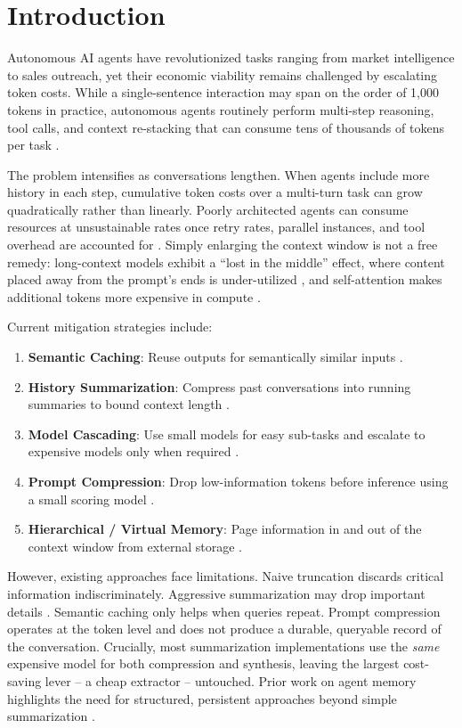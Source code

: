 \documentclass[conference]{IEEEtran}
\begin{document}
\section{Introduction}

Autonomous AI agents have revolutionized tasks ranging from market intelligence to sales outreach, yet their economic viability remains challenged by escalating token costs. While a single-sentence interaction may span on the order of 1,000 tokens in practice, autonomous agents routinely perform multi-step reasoning, tool calls, and context re-stacking that can consume tens of thousands of tokens per task \cite{zhou2024agents, shinn2023reflexion, park2023generative}.

The problem intensifies as conversations lengthen. When agents include more history in each step, cumulative token costs over a multi-turn task can grow quadratically rather than linearly. Poorly architected agents can consume resources at unsustainable rates once retry rates, parallel instances, and tool overhead are accounted for \cite{shinn2023reflexion}. Simply enlarging the context window is not a free remedy: long-context models exhibit a ``lost in the middle'' effect, where content placed away from the prompt's ends is under-utilized \cite{nfliu2023lost}, and self-attention makes additional tokens more expensive in compute \cite{packer2023memgpt}.

Current mitigation strategies include:
\begin{enumerate}
    \item \textbf{Semantic Caching}: Reuse outputs for semantically similar inputs \cite{bang2023gptcache}.
    \item \textbf{History Summarization}: Compress past conversations into running summaries to bound context length \cite{sung2024wmt}.
    \item \textbf{Model Cascading}: Use small models for easy sub-tasks and escalate to expensive models only when required \cite{chen2023frugalgpt}.
    \item \textbf{Prompt Compression}: Drop low-information tokens before inference using a small scoring model \cite{jiang2023llmlingua}.
    \item \textbf{Hierarchical / Virtual Memory}: Page information in and out of the context window from external storage \cite{packer2023memgpt}.
\end{enumerate}

However, existing approaches face limitations. Naive truncation discards critical information indiscriminately. Aggressive summarization may drop important details \cite{sung2024wmt}. Semantic caching only helps when queries repeat. Prompt compression operates at the token level and does not produce a durable, queryable record of the conversation. Crucially, most summarization implementations use the \emph{same} expensive model for both compression and synthesis, leaving the largest cost-saving lever -- a cheap extractor -- untouched. Prior work on agent memory highlights the need for structured, persistent approaches beyond simple summarization \cite{park2023generative, zhong2024memorybank, zhang2024memorysurvey}.
\end{document}
